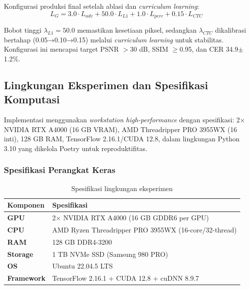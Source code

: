 Konfigurasi produksi final setelah ablasi dan \textit{curriculum learning}:
\begin{equation}
\boxed{L_G = 3.0 \cdot L_{adv} + 50.0 \cdot L_{L1} + 1.0 \cdot L_{perc} + 0.15 \cdot L_{CTC}}
\end{equation}

Bobot tinggi $\lambda_{L1}=50.0$ memastikan kesetiaan piksel, sedangkan $\lambda_{CTC}$ dikalibrasi bertahap (0.05→0.10→0.15) melalui \textit{curriculum learning} untuk stabilitas. Konfigurasi ini mencapai target PSNR $>$30 dB, SSIM $\geq$0.95, dan CER 34.9$\pm$1.2\%.

\subsection{Lingkungan Eksperimen dan Spesifikasi Komputasi}
\label{subsec:spesifikasi-lingkungan}

Implementasi menggunakan \textit{workstation high-performance} dengan spesifikasi: 2$\times$ NVIDIA RTX A4000 (16 GB VRAM), AMD Threadripper PRO 3955WX (16 inti), 128 GB RAM, TensorFlow 2.16.1/CUDA 12.8, dalam lingkungan Python 3.10 yang dikelola Poetry untuk reproduktifitas.

\subsubsection{Spesifikasi Perangkat Keras}
\label{subsubsec:hardware-spec}

\begin{table}[H]
\centering
\caption{Spesifikasi lingkungan eksperimen}
\label{tab:hardware-specs-actual}
\small
\begin{tabular}{|l|l|}
\hline
\textbf{Komponen} & \textbf{Spesifikasi} \\
\hline
\textbf{GPU} & 2$\times$ NVIDIA RTX A4000 (16 GB GDDR6 per GPU) \\
\hline
\textbf{CPU} & AMD Ryzen Threadripper PRO 3955WX (16-core/32-thread) \\
\hline
\textbf{RAM} & 128 GB DDR4-3200 \\
\hline
\textbf{Storage} & 1 TB NVMe SSD (Samsung 980 PRO) \\
\hline
\textbf{OS} & Ubuntu 22.04.5 LTS \\
\hline
\textbf{Framework} & TensorFlow 2.16.1 + CUDA 12.8 + cuDNN 8.9.7 \\
\hline
\end{tabular}
\end{table}

